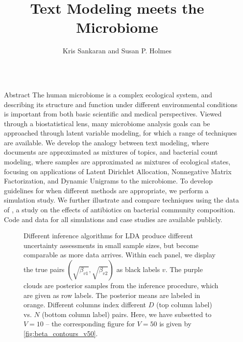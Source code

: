 \documentclass[final]{beamer}
\title{Text Modeling meets the Microbiome}
\author{Kris Sankaran and Susan P. Holmes}
\institute{Department of Statistics, Stanford University}
\newlength{\sepwid}
\newlength{\onecolwid}
\begin{document}

\begin{frame}

\begin{columns}

\begin{column}{\sepwid}\end{column}
\begin{column}{\onecolwid}

\begin{block}{Abstract}
The human microbiome is a complex ecological system, and describing its
structure and function under different environmental conditions is important
from both basic scientific and medical perspectives. Viewed through a
biostatistical lens, many microbiome analysis goals can be approached through
latent variable modeling, for which a range of techniques are available. We
develop the analogy between text modeling, where documents are approximated as
mixtures of topics, and bacterial count modeling, where samples are approximated
as mixtures of ecological states, focusing on applications of Latent Dirichlet
Allocation, Nonnegative Matrix Factorization, and Dynamic Unigrams to the
microbiome. To develop guidelines for when different methods are appropriate, we
perform a simulation study. We further illustrate and compare techniques using
the data of \citep{dethlefsen2011incomplete}, a study on the effects of
antibiotics on bacterial community composition. Code and data for all
simulations and case studies are available publicly.
\end{block}

\begin{figure}[!p]
  \caption{Different inference algorithms for LDA produce different uncertainty
    assessments in small sample sizes, but become comparable as more data arrives.
    Within each panel, we display the true pairs $\left(\sqrt{\beta_{v1}},
    \sqrt{\beta_{v2}}\right)$ as black labels $v$. The purple clouds are
    posterior samples from the inference procedure, which are given as row labels. The
    posterior means are labeled in orange. Different columns index different $D$
    (top column label) vs. $N$ (bottom column label) pairs. Here, we have
    subsetted to $V = 10$ -- the corresponding figure for $V = 50$ is given by
    \ref{fig:beta_contours_v50}.
  }
  \label{fig:beta_contours_v10}
\end{figure}


\end{column}
\end{columns}
\end{frame}
\end{document}

